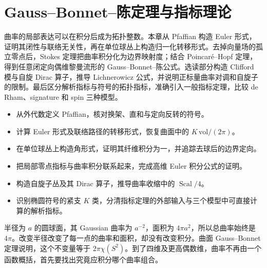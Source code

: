 
% 
% 

\chapter{Gauss–Bonnet–陈定理与指标理论}
\label{g3:ch:17}

\begin{chapterabstract}
	曲率的局部表达可以在积分后成为拓扑整数。本章从 Pfaffian 构造 Euler 形式，证明其闭性与联络无关性，再在单位球丛上构造归一化转移形式。去掉向量场的孤立零点后，Stokes 定理把曲率积分化为边界映射度；结合 Poincaré--Hopf 定理，得到任意闭定向偶维黎曼流形的 Gauss--Bonnet--陈公式。选读部分构造 Clifford 模与自旋 Dirac 算子，推导 Lichnerowicz 公式，并说明正标量曲率对调和自旋子的限制。最后区分解析指标与符号的拓扑指标，准确引入一般指标定理，比较 de Rham、signature 和 spin 三种模型。
\end{chapterabstract}

\begin{learninggoals}
	\begin{itemize}
		\item 从外代数定义 Pfaffian，核对换架、直和与定向反转的符号。
		\item 计算 Euler 形式及联络路径的转移形式，恢复曲面中的 \(K\,\mathrm{vol}/(2\pi)\)。
		\item 在单位球丛上构造角形式，证明其纤维积分为一，并追踪去球后的边界定向。
		\item 把局部零点指标与曲率积分联系起来，完成高维 Euler 积分公式的证明。
		\item 构造自旋子丛及其 Dirac 算子，推导曲率收缩中的 \(\operatorname{Scal}/4\)。
		\item 识别椭圆符号的紧支 \(K\) 类，分清指标定理的外部输入与三个模型中可直接计算的解析指标。
	\end{itemize}
\end{learninggoals}

半径为 \(a\) 的圆球面，其 Gaussian 曲率为 \(a^{-2}\)，面积为 \(4\pi a^2\)，所以总曲率始终是 \(4\pi\)。改变半径改变了每一点的曲率和面积，却没有改变积分。曲面 Gauss--Bonnet 定理说明，这个不变量等于 \(2\pi\chi(S^2)\)。到了四维及更高偶数维，曲率不再由一个函数概括，首先要找出究竟应积分哪个曲率组合。

